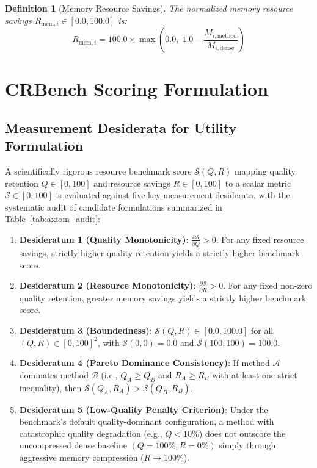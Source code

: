 \documentclass[11pt,a4paper]{article}
\newtheorem{definition}{Definition}
\begin{document}
\begin{definition}[Memory Resource Savings]
The normalized memory resource savings $R_{\text{mem}, i} \in [0.0, 100.0]$ is:
\begin{equation}
\label{eq:resource_savings}
\boxed{
R_{\text{mem}, i} = 100.0 \times \max\left(0.0, \; 1.0 - \frac{M_{i, \text{method}}}{M_{i, \text{dense}}}\right)
}
\end{equation}
\end{definition}

\section{CRBench Scoring Formulation}
\label{sec:scoring}

\subsection{Measurement Desiderata for Utility Formulation}
A scientifically rigorous resource benchmark score $\mathcal{S}(Q, R)$ mapping quality retention $Q \in [0, 100]$ and resource savings $R \in [0, 100]$ to a scalar metric $\mathcal{S} \in [0, 100]$ is evaluated against five key measurement desiderata, with the systematic audit of candidate formulations summarized in Table~\ref{tab:axiom_audit}:

\begin{enumerate}[leftmargin=*]
    \item \textbf{Desideratum 1 (Quality Monotonicity)}: $\frac{\partial \mathcal{S}}{\partial Q} > 0$. For any fixed resource savings, strictly higher quality retention yields a strictly higher benchmark score.
    \item \textbf{Desideratum 2 (Resource Monotonicity)}: $\frac{\partial \mathcal{S}}{\partial R} > 0$. For any fixed non-zero quality retention, greater memory savings yields a strictly higher benchmark score.
    \item \textbf{Desideratum 3 (Boundedness)}: $\mathcal{S}(Q, R) \in [0.0, 100.0]$ for all $(Q, R) \in [0, 100]^2$, with $\mathcal{S}(0, 0) = 0.0$ and $\mathcal{S}(100, 100) = 100.0$.
    \item \textbf{Desideratum 4 (Pareto Dominance Consistency)}: If method $\mathcal{A}$ dominates method $\mathcal{B}$ (i.e., $Q_A \ge Q_B$ and $R_A \ge R_B$ with at least one strict inequality), then $\mathcal{S}(Q_A, R_A) > \mathcal{S}(Q_B, R_B)$.
    \item \textbf{Desideratum 5 (Low-Quality Penalty Criterion)}: Under the benchmark's default quality-dominant configuration, a method with catastrophic quality degradation (e.g., $Q < 10\%$) does not outscore the uncompressed dense baseline $(Q=100\%, R=0\%)$ simply through aggressive memory compression ($R \to 100\%$).
\end{enumerate}
\end{document}

